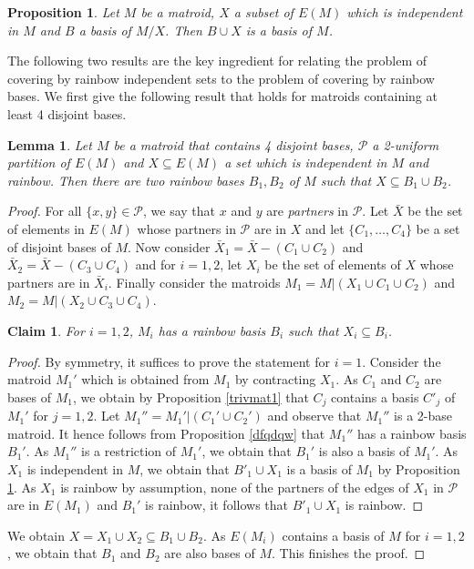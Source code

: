 \documentclass{article}
\newtheorem{Proposition}[Statement]{Proposition}
\newtheorem{Claim}[Statement]{Claim}
\newtheorem{Lemma}[Statement]{Lemma}
\begin{document}
\begin{Proposition}\label{trivmat2}
Let $M$ be a matroid, $X$ a subset of $E(M)$ which is independent in $M$ and $B$ a basis of $M/X$. Then $B\cup X$ is a basis of $M$.
\end{Proposition}

The following two results are the key ingredient for relating the problem of covering by rainbow independent sets to the problem of covering by rainbow bases. We first give the following result that holds for matroids containing at least 4 disjoint bases.
\begin{Lemma}\label{foresttree}
Let $M$ be a matroid that contains 4 disjoint bases, $\mathcal{P}$ a 2-uniform partition of $E(M)$ and $X \subseteq E(M)$ a set which is independent in $M$ and rainbow. Then there are two rainbow bases $B_1,B_2$ of $M$ such that $X\subseteq B_1 \cup B_2$.
\end{Lemma}
\begin{proof}
For all $\{x,y\}\in \mathcal{P}$, we say that $x$ and $y$ are {\it partners} in $\mathcal{P}$. Let $\bar{X}$ be the set of elements in $E(M)$ whose partners in $\mathcal{P}$ are in $X$ and let $\{C_1,\ldots,C_4\}$ be a set of disjoint bases of $M$. Now consider $\bar{X}_1=\bar{X}-(C_1\cup C_2)$ and $\bar{X}_2=\bar{X}-(C_3\cup C_4)$ and for $i=1,2$, let $X_i$ be the set of elements of $X$ whose partners are in $\bar{X}_i$. Finally consider the matroids $M_1=M|(X_1 \cup C_1 \cup C_2)$ and $M_2=M|(X_2 \cup C_3 \cup C_4)$.

\begin{Claim}
For $i=1,2$, $M_i$ has a rainbow basis $B_i$ such that $X_i \subseteq B_i$.
\end{Claim}
\begin{proof} By symmetry, it suffices to prove the statement for $i=1$. 
Consider the matroid $M_1'$ which is obtained from $M_1$ by contracting $X_1$. As $C_1$ and $C_2$ are bases of $M_1$,  we obtain by Proposition \ref{trivmat1} that $C_j$ contains a basis $C'_j$ of $M_1'$ for $j=1,2$. Let $M_1''=M_1'|(C_1' \cup C_2')$ and observe that $M_1''$ is a 2-base matroid. It hence follows from Proposition \ref{dfqdqw} that $M_1''$ has a rainbow basis $B_1'$. As $M_1''$ is a restriction of $M_1'$, we obtain that $B_1'$ is also a basis of $M_1'$. As $X_1$ is independent in $M$, we obtain that $B'_1\cup X_1$ is a basis of $M_1$ by Proposition \ref{trivmat2}. As $X_1$ is rainbow  by assumption, none of the partners of the edges of $X_1$ in $\mathcal{P}$ are in $E(M_1)$ and $B_1'$ is rainbow, it follows that $B'_1\cup X_1$ is rainbow.
\end{proof}
We obtain $X=X_1 \cup X_2\subseteq B_1 \cup B_2$. As $E(M_i)$ contains a basis of $M$ for $i=1,2$, we obtain that $B_1$ and $B_2$ are also bases of $M$. This finishes the proof.
\end{proof}
\end{document}
